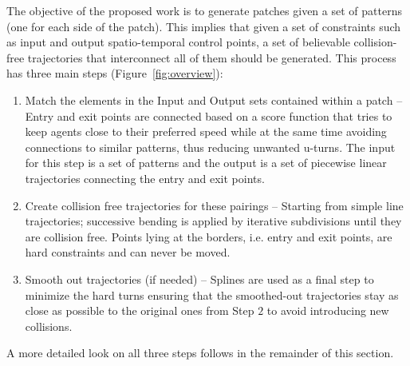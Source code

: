 The objective of the proposed work is to generate patches given a set of patterns (one for each side of the patch).
This implies that given a set of constraints such as input and output spatio-temporal control points, a set of believable collision-free trajectories that interconnect all of them should be generated.
This process has three main steps (Figure~\ref{fig:overview}):
\begin{enumerate}
  \item Match the elements in the Input and Output sets contained within a patch {--}
  Entry and exit points are connected based on a score function that tries to keep agents close to their preferred speed while at the same time avoiding connections to similar patterns, thus reducing unwanted u-turns.
  The input for this step is a set of patterns and the output is a set of piecewise linear trajectories connecting the entry and exit points.
  \item Create collision free trajectories for these pairings {--}
  Starting from simple line trajectories; successive bending is applied by iterative subdivisions until they are collision free.
  Points lying at the borders, i.e. entry and exit points, are hard constraints and can never be moved.
  \item Smooth out trajectories (if needed) {--}
   Splines are used as a final step to minimize the hard turns ensuring that the smoothed-out trajectories stay as close as possible to the original ones from Step $2$ to avoid introducing new collisions.
\end{enumerate}

% 
% 
%       

A more detailed look on all three steps follows in the remainder of this section.

